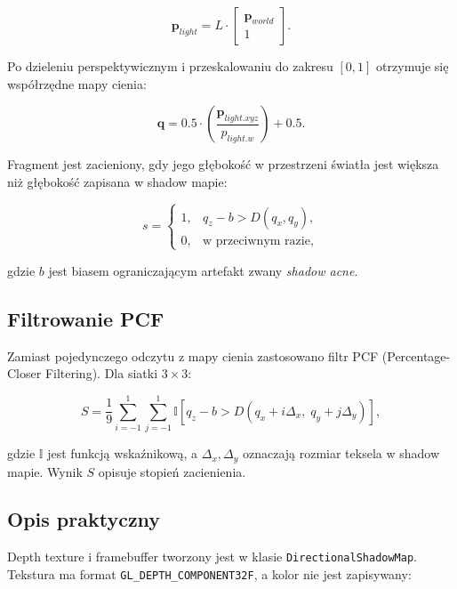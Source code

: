 \documentclass[12pt,a4paper]{article}
\begin{document}
\begin{equation}
    \mathbf{p}_{light} = L \cdot
    \begin{bmatrix}
    \mathbf{p}_{world} \\
    1
    \end{bmatrix}.
\end{equation}

Po dzieleniu perspektywicznym i przeskalowaniu do zakresu $[0,1]$ otrzymuje się współrzędne mapy cienia:

\begin{equation}
    \mathbf{q} = 0.5 \cdot
    \left(
    \frac{\mathbf{p}_{light.xyz}}{p_{light.w}}
    \right)
    + 0.5.
\end{equation}

Fragment jest zacieniony, gdy jego głębokość w przestrzeni światła jest większa niż głębokość zapisana w shadow mapie:

\begin{equation}
    s =
    \begin{cases}
    1, & q_z - b > D(q_x,q_y), \\
    0, & \text{w przeciwnym razie},
    \end{cases}
\end{equation}

gdzie $b$ jest biasem ograniczającym artefakt zwany \textit{shadow acne}.

\subsection{Filtrowanie PCF}

Zamiast pojedynczego odczytu z mapy cienia zastosowano filtr PCF (Percentage-Closer Filtering). Dla siatki $3 \times 3$:

\begin{equation}
    S =
    \frac{1}{9}
    \sum_{i=-1}^{1}
    \sum_{j=-1}^{1}
    \mathbb{I}
    \left[
    q_z - b > D(q_x + i\Delta_x,\; q_y + j\Delta_y)
    \right],
\end{equation}

gdzie $\mathbb{I}$ jest funkcją wskaźnikową, a $\Delta_x,\Delta_y$ oznaczają rozmiar teksela w shadow mapie. Wynik $S$ opisuje stopień zacienienia.

\subsection{Opis praktyczny}

Depth texture i framebuffer tworzony jest w klasie \texttt{DirectionalShadowMap}. Tekstura ma format \texttt{GL\_DEPTH\_COMPONENT32F}, a kolor nie jest zapisywany:
\end{document}
